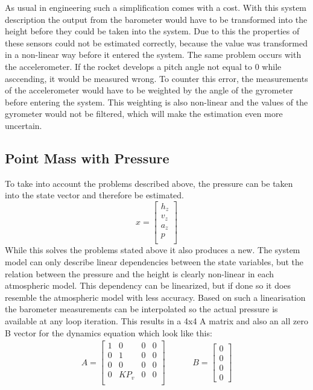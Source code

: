   As usual in engineering such a simplification comes with a cost. With this system description the output from the barometer would have
  to be transformed into the height before they could be taken into the system.
  Due to this the properties of these sensors could not be estimated correctly, because the value was transformed in a non-linear way before it entered the system.
  The same problem occurs with the accelerometer. If the rocket develops a pitch angle not equal to 0 while asccending, it would be measured wrong.
  To counter this error, the measurements of the accelerometer would have to be weighted by the angle of the gyrometer before entering the system.
  This weighting is also non-linear and the values of the gyrometer would not be filtered, which will make the estimation even more uncertain.

  \subsection{Point Mass with Pressure}
  To take into account the problems described above, the pressure can be taken into the state vector and therefore be estimated.
  $$ x = \begin{bmatrix}
  h_z\\
  v_z\\
  a_z\\
  p\\
  \end{bmatrix} $$
  While this solves the problems stated above it also produces a new. The system model can only describe linear dependencies between the state variables,
  but the relation between the pressure and the height is clearly non-linear in each atmospheric model.
  This dependency can be linearized, but if done so it does resemble the atmospheric model with less accuracy.
  Based on such a linearisation the barometer measurements can be interpolated so the actual pressure is available at any loop iteration.
  This results in a 4x4 A matrix and also an all zero B vector for the dynamics equation which look like this:
  \begin{align*}
  A = \begin{bmatrix}
         1    & 0 & 0 & 0    \\
         0    & 1 & 0 & 0    \\
         0    & 0 & 0 & 0    \\
         0    & KP_v & 0 & 0\\
        \end{bmatrix}
        & \hspace{1cm}
    B = \begin{bmatrix}
       0 \\
       0 \\
       0 \\
       0
      \end{bmatrix}
  \end{align*}

